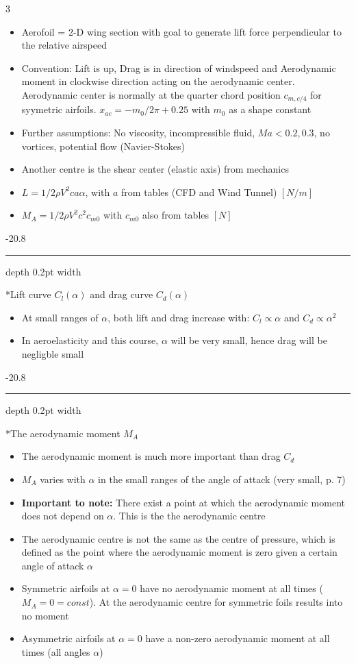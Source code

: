 \documentclass[8pt, landscape, fleqn]{scrartcl}
\makeatletter
\renewcommand{\subsubsection}{\@startsection{subsubsection}{1}{0mm}%
{-2\baselineskip}{0.8\baselineskip}%
{\hrule depth 0.2pt width\columnwidth\vspace*{1.2em}\normalsize\bfseries\rmfamily}}
\makeatother
\begin{document}
\begin{multicols*}{3}
\begin{itemize}
    \item Aerofoil = 2-D wing section with goal to generate lift force perpendicular to the relative airspeed
    \item Convention: Lift is up, Drag is in direction of windspeed and Aerodynamic moment in clockwise direction acting on the aerodynamic center. Aerodynamic center is normally at the quarter chord position $c_{m,c/4}$ for syymetric airfoils. $x_{ac} = -m_0/2\pi +0.25$ with $m_0$ as a shape constant 
    \item Further assumptions: No viscosity, incompressible fluid, $Ma < 0.2,0.3$, no vortices, potential flow (Navier-Stokes)
    \item Another centre is the shear center (elastic axis) from mechanics
    \item $L = 1/2\rho V^2 c a \alpha$, with $a$ from tables (CFD and Wind Tunnel) $[N/m]$
    \item $M_A = 1/2\rho V^2c^2 c_{m0}$ with $c_{m0}$ also from tables $[N]$
\end{itemize}

\subsubsection*{Lift curve $C_l(\alpha)$ and drag curve $C_d(\alpha)$}

\begin{itemize}
    \item At small ranges of $\alpha$, both lift and drag increase with: $C_l \propto \alpha$ and $C_d \propto \alpha^2$
    \item In aeroelasticity and this course, $\alpha$ will be very small, hence drag will be negligble small
\end{itemize}

\subsubsection*{The aerodynamic moment $M_A$}

\begin{itemize}
    \item The aerodynamic moment is much more important than drag $C_d$
    \item $M_A$ varies with $\alpha$ in the small ranges of the angle of attack (very small, p. 7)
    \item {\bf Important to note:} There exist a point at which the aerodynamic moment does not depend on $\alpha$. This is the the aerodynamic centre
    \item The aerodynamic centre is not the same as the centre of pressure, which is defined as the point where the aerodynamic moment is zero given a certain angle of attack $\alpha$
    \item Symmetric airfoils at $\alpha=0$ have no aerodynamic moment at all times ($M_A = 0 = const$). At the aerodynamic centre for symmetric foils results into no moment
    \item Asymmetric airfoils at $\alpha=0$ have a non-zero aerodynamic moment at all times (all angles $\alpha$)
\end{itemize}



\end{multicols*}
\end{document}

